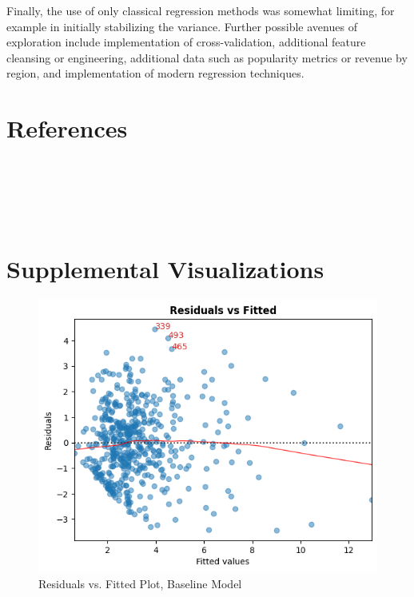 \documentclass[10pt]{article}
\begin{document}
Finally, the use of only classical regression methods was somewhat limiting, for example in initially stabilizing the variance. Further possible avenues of exploration include implementation of cross-validation, additional feature cleansing or engineering, additional data such as popularity metrics or revenue by region, and implementation of modern regression techniques. 

% 
%

\section*{References}

\\[1em]
\\[1em]
\\[1em]
\\[1em]

\appendix
\clearpage

\section{Supplemental Visualizations}
\begin{figure}[H]
\centering
	\centerline{\includegraphics[width=\columnwidth]{baseline_residuals_vs_fitted}}
	\caption{Residuals vs. Fitted Plot, Baseline Model\label{baseline_residuals_vs_fitted}}
\end{figure}
\end{document}
